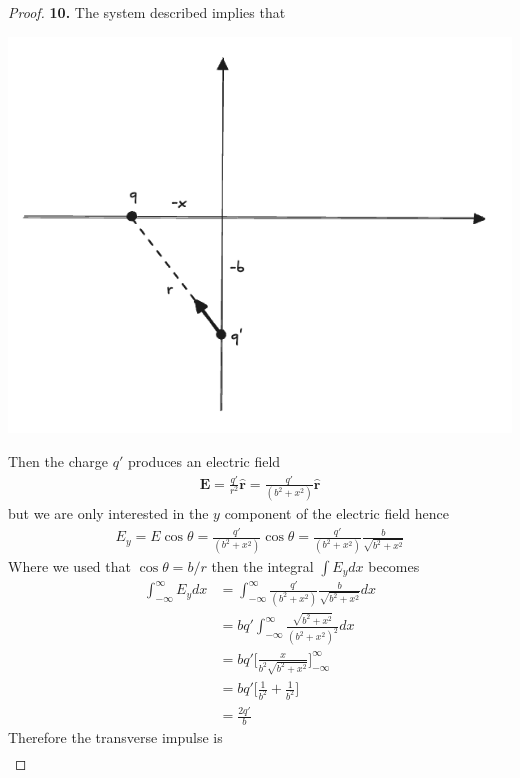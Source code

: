 \documentclass[11pt]{article}
\newcommand{\hatr}{\bm{\hat{r}}}
\theoremstyle{definition}
\begin{document}
\cleardoublepage
\begin{proof}{\textbf{10.}}
    The system described implies that
    \begin{center}
        \includegraphics*[scale=0.4]{ch2-10.png}
    \end{center}
    Then the charge $q'$ produces an electric field
    \begin{align*}
        \bm E = \frac{q'}{r^2}\hatr = \frac{q'}{(b^2 + x^2)}\hatr
    \end{align*}
    but we are only interested in the $y$ component of the electric field
    hence
    \begin{align*}
        E_y = E\cos\theta = \frac{q'}{(b^2 + x^2)}\cos\theta
        = \frac{q'}{(b^2 + x^2)}\frac{b}{\sqrt{b^2 + x^2}}
    \end{align*}
    Where we used that $\cos\theta = b/r$ then the integral $\int E_y dx$
    becomes
    \begin{align*}
        \int_{-\infty}^\infty E_y dx
        &= \int_{-\infty}^\infty
        \frac{q'}{(b^2 + x^2)}\frac{b}{\sqrt{b^2 + x^2}} dx\\
        &= bq'\int_{-\infty}^\infty\frac{\sqrt{b^2 + x^2}}{(b^2 + x^2)^2}dx\\
        &= bq'\bigg[\frac{x}{b^2\sqrt{b^2 + x^2}}\bigg]_{-\infty}^\infty\\
        &= bq'\bigg[\frac{1}{b^2} + \frac{1}{b^2} \bigg]\\
        &= \frac{2q'}{b}
    \end{align*}
    Therefore the transverse impulse is 
    \begin{align*}

\end{align*}
\end{proof}
\end{document}
